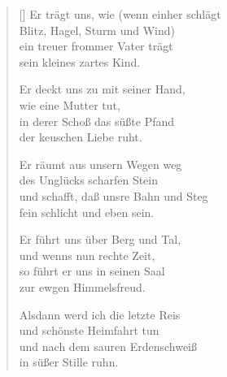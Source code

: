 \begin{multicols}{2}
\begin{verse}[\versewidth]
 Er trägt uns, wie (wenn einher schlägt\\
Blitz, Hagel, Sturm und Wind)\\
ein treuer frommer Vater trägt\\
sein kleines zartes Kind.

 Er deckt uns zu mit seiner Hand,\\
wie eine Mutter tut,\\
in derer Schoß das süßte Pfand\\
der keuschen Liebe ruht.

 Er räumt aus unsern Wegen weg\\
des Unglücks scharfen Stein\\
und schafft, daß unsre Bahn und Steg\\
fein schlicht und eben sein.

 Er führt uns über Berg und Tal,\\
und wenns nun rechte Zeit,\\
so führt er uns in seinen Saal\\
zur ewgen Himmelsfreud.

 Alsdann werd ich die letzte Reis\\
und schönste Heimfahrt tun\\
und nach dem sauren Erdenschweiß\\
in süßer Stille ruhn.

\end{verse}
\end{multicols}
